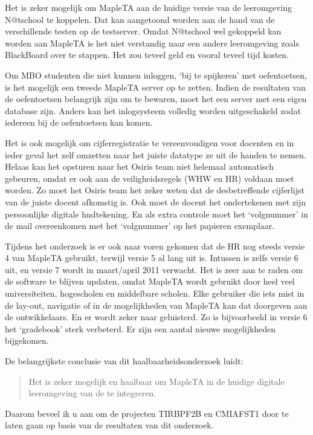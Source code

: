 
Het is zeker mogelijk om MapleTA aan de huidige versie van de
leeromgeving N@tschool te koppelen. Dat kan aangetoond worden aan de
hand van de verschillende testen op de testserver. Omdat N@tschool wel
gekoppeld kan worden aan MapleTA is het niet verstandig naar een
andere leeromgeving zoals BlackBoard over te stappen. Het zou teveel
geld en vooral teveel tijd kosten.

Om MBO studenten die niet kunnen inloggen, `bij te spijkeren' met
oefentoetsen, is het mogelijk een tweede MapleTA server op te
zetten. Indien de resultaten van de oefentoetsen belangrijk zijn om te
bewaren, moet het een server met een eigen database zijn. Anders kan
het inlogsysteem volledig worden uitgeschakeld zodat iedereen bij
de oefentoetsen kan komen.

Het is ook mogelijk om cijferregistratie te vereenvoudigen voor
docenten en in ieder geval het zelf omzetten naar het juiste datatype
ze uit de handen te nemen. Helaas kan het opsturen naar het Osiris
team niet helemaal automatisch gebeuren, omdat er ook aan de
veiligheidsregels (WHW en HR) voldaan moet worden. Zo moet het Osiris
team het zeker weten dat de desbetreffende cijferlijst van de juiste
docent afkomstig is. Ook moet de docent het ondertekenen met zijn
persoonlijke digitale hndtekening. En als extra controle moet het
`volgnummer' in de mail overeenkomen met het `volgnummer' op het
papieren exemplaar.

Tijdens het onderzoek is er ook naar voren gekomen dat de HR nog
steeds versie 4 van MapleTA gebruikt, terwijl versie 5 al lang uit
is. Intussen is zelfs versie 6 uit, en versie 7 wordt in maart/april
2011 verwacht. Het is zeer aan te raden om de software te blijven
updaten, omdat MapleTA wordt gebruikt door heel veel universiteiten,
hogescholen en middelbare scholen. Elke gebruiker die iets mist in de
lay-out, navigatie of in de mogelijkheden van MapleTA kan dat
doorgeven aan de ontwikkelaars. En er wordt zeker naar geluisterd. Zo
is bijvoorbeeld in versie 6 het `gradebook' sterk verbeterd. Er zijn
een aantal nieuwe mogelijkheden bijgekomen.

De belangrijkste conclusie van dit haalbaarheidsonderzoek luidt:

\begin{quote} Het is zeker mogelijk en haalbaar om MapleTA in de
  huidige digitale leeromgeving van de \HR{} te integreren.
\end{quote}

Daarom beveel ik u aan om de projecten TIRBPF2B en CMIAFST1 door te
laten gaan op basis van de resultaten van dit onderzoek.
